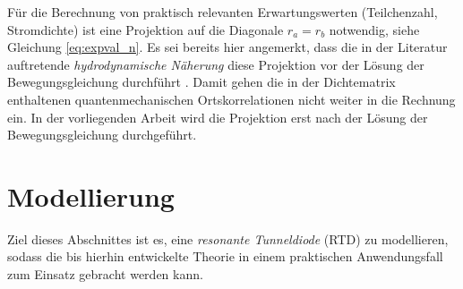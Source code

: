 Für die Berechnung von praktisch relevanten Erwartungswerten (Teilchenzahl, Stromdichte) ist eine Projektion auf die Diagonale $r_a=r_b$ notwendig, siehe Gleichung \eqref{eq:expval_n}. Es sei bereits hier angemerkt, dass die in der Literatur auftretende  \emph{hydrodynamische Näherung} diese Projektion vor der Lösung der Bewegungsgleichung durchführt \cite{wiedenhaus}. Damit gehen die in der Dichtematrix enthaltenen quantenmechanischen Ortskorrelationen nicht weiter in die Rechnung ein. In der vorliegenden Arbeit wird die Projektion erst nach der Lösung der Bewegungsgleichung durchgeführt.


\section{Modellierung}
\label{sec:modellierung}
Ziel dieses Abschnittes ist es, eine \emph{resonante Tunneldiode} (RTD)  zu modellieren, sodass die bis hierhin entwickelte Theorie in einem praktischen Anwendungsfall zum Einsatz gebracht werden kann.

